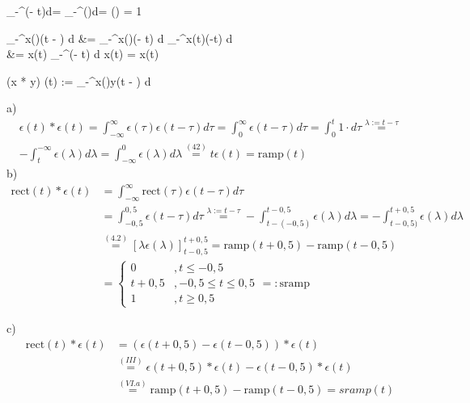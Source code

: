 \documentclass[parskip=half]{scrreprt}
\newcommand{\rect}{\text{rect}}
\newcommand{\ramp}{\text{ramp}}
\newcommand{\sramp}{\text{sramp}}
\begin{document}
\begin{abox}
	\int_{-\infty}^{\infty}\delta(\tau - t)d\tau = \int_{-\infty}^{\infty}\delta(\lambda)d\lambda = \epsilon(\infty) = 1
\end{abox}


\begin{abox}
	\int_{-\infty}^{\infty}x(\tau)\delta(t  - \tau) d \tau &= 	\int_{-\infty}^{\infty}x(\tau)\delta(\tau - t) d \tau {}	\int_{-\infty}^{\infty}x(t)\delta(\tau -t) d \tau \\
	&= x(t)	\int_{-\infty}^{\infty}\delta(\tau - t) d \tau {} x(t)  = x(t)
\end{abox}

\begin{abox}
	(x * y) (t) := 	\int_{-\infty}^{\infty}x(\tau)y(t  - \tau) d \tau
\end{abox}

\begin{tbox}
	a) \begin{align*}\epsilon(t) * \epsilon(t) = \int_{-\infty}^{\infty}\epsilon(\tau)\epsilon(t  - \tau) d \tau = 
	\int_{0}^{\infty}\epsilon(t  - \tau) d \tau = 	\int_{0}^{t}1 \cdot d\tau \overset{\lambda := t-\tau}{=}\\
		-\int_{t}^{-\infty}\epsilon(\lambda) d \lambda = 
			\int_{-\infty}^{0}\epsilon(\lambda) d \lambda \overset{(42)}{=} t\epsilon(t) = \text{ramp}(t)\end{align*}
	b) \begin{align*}
	\text{rect}(t) * \epsilon(t) &= 	\int_{-\infty}^{\infty}\rect(\tau)\epsilon(t  - \tau) d \tau \\&= 
		\int_{-0,5}^{0,5}\epsilon(t  - \tau) d \tau \overset{\lambda := t-\tau}{=}
		-\int_{t-(-0,5)}^{t-0,5}\epsilon(\lambda) d \lambda = 
		-\int_{t-0,5)}^{t+0,5}\epsilon(\lambda) d \lambda\\ &\overset{(4.2)}{=}[\lambda\epsilon(\lambda)]_{t-0,5}^{t+0,5}
		= \ramp(t+0,5) - \ramp(t-0,5)\\
		&= \begin{cases}
		0 &, t \leq -0,5\\
		t+0,5 &, -0,5 \leq t \leq 0,5\\
		1 &, t \geq 0,5
		\end{cases} =: \sramp
		\end{align*}
\end{tbox}

\begin{tbox}
	c) \begin{align*}
		\rect(t) * \epsilon(t) &= (\epsilon(t+0,5) - \epsilon(t-0,5)) * \epsilon(t)\\
		 &\overset{(III)}{=}\epsilon(t +0,5) * \epsilon(t) - \epsilon(t-0,5) * \epsilon(t)\\
		 &\overset{(VI.a)}{=} \ramp(t + 0,5) - \ramp( t - 0,5) = sramp(t)
	\end{align*}
\end{tbox}
\end{document}
